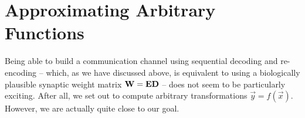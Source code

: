 \documentclass[10pt,letterpaper,oneside]{article}
\begin{document}
{%
	
	}


	
	\section{Approximating Arbitrary Functions}

	Being able to build a communication channel using sequential decoding and re-encoding -- which, as we have discussed above, is equivalent to using a biologically plausible synaptic weight matrix ${\mathbf{W}} = {\mathbf{E}} {\mathbf{D}}$ -- does not seem to be particularly exciting. After all, we set out to compute arbitrary transformations $\vec y = f(\vec x)$. However, we are actually quite close to our goal.
\end{document}
